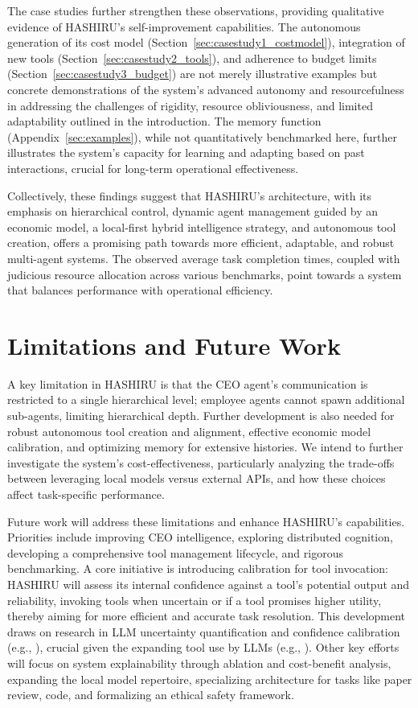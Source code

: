 \documentclass[conference]{IEEEtran}
\begin{document}
The case studies further strengthen these observations, providing qualitative evidence of HASHIRU's self-improvement capabilities. The autonomous generation of its cost model (Section~\ref{sec:casestudy1_costmodel}), integration of new tools (Section~\ref{sec:casestudy2_tools}), and adherence to budget limits (Section~\ref{sec:casestudy3_budget}) are not merely illustrative examples but concrete demonstrations of the system's advanced autonomy and resourcefulness in addressing the challenges of rigidity, resource obliviousness, and limited adaptability outlined in the introduction. The memory function (Appendix~\ref{sec:examples}), while not quantitatively benchmarked here, further illustrates the system's capacity for learning and adapting based on past interactions, crucial for long-term operational effectiveness.

Collectively, these findings suggest that HASHIRU's architecture, with its emphasis on hierarchical control, dynamic agent management guided by an economic model, a local-first hybrid intelligence strategy, and autonomous tool creation, offers a promising path towards more efficient, adaptable, and robust multi-agent systems. The observed average task completion times, coupled with judicious resource allocation across various benchmarks, point towards a system that balances performance with operational efficiency.

\section{Limitations and Future Work}
\label{sec:limitations_future_work}

A key limitation in HASHIRU is that the CEO agent's communication is restricted to a single hierarchical level; employee agents cannot spawn additional sub-agents, limiting hierarchical depth. Further development is also needed for robust autonomous tool creation and alignment, effective economic model calibration, and optimizing memory for extensive histories. We intend to further investigate the system's cost-effectiveness, particularly analyzing the trade-offs between leveraging local models versus external APIs, and how these choices affect task-specific performance.

Future work will address these limitations and enhance HASHIRU's capabilities. Priorities include improving CEO intelligence, exploring distributed cognition, developing a comprehensive tool management lifecycle, and rigorous benchmarking. A core initiative is introducing calibration for tool invocation: HASHIRU will assess its internal confidence against a tool's potential output and reliability, invoking tools when uncertain or if a tool promises higher utility, thereby aiming for more efficient and accurate task resolution. This development draws on research in LLM uncertainty quantification and confidence calibration (e.g., \cite{manggalaqa, spiess2024calibration}), crucial given the expanding tool use by LLMs (e.g., \cite{Qin2023ToolLLM}). Other key efforts will focus on system explainability through ablation and cost-benefit analysis, expanding the local model repertoire, specializing architecture for tasks like paper review, code, and formalizing an ethical safety framework.
\end{document}

